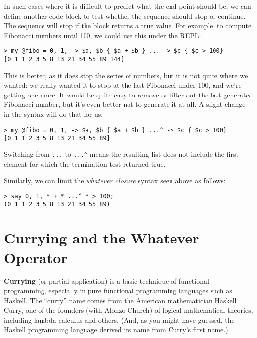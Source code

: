 In such cases where it is difficult to predict what the end 
point should be, we can define another code block to test 
whether the sequence should stop or continue. The sequence 
will stop if the block returns a true value. For example, 
to compute Fibonacci numbers until 100, we could use this 
under the REPL:

\begin{verbatim}
> my @fibo = 0, 1, -> $a, $b { $a + $b } ... -> $c { $c > 100}
[0 1 1 2 3 5 8 13 21 34 55 89 144]
\end{verbatim}

This is better, as it does stop the series of numbers, but it is 
not quite where we wanted: we really wanted it to stop at the last 
Fibonacci under 100, and we're getting one more. It would be 
quite easy to remove or filter out the last generated Fibonacci 
number, but it's even better not to generate it at all. A slight 
change in the syntax will do that for us:

\begin{verbatim}
> my @fibo = 0, 1, -> $a, $b { $a + $b } ...^ -> $c { $c > 100}
[0 1 1 2 3 5 8 13 21 34 55 89]
\end{verbatim}

Switching from \verb'...' to \verb'...^' means the 
resulting list does not include the first element 
for which the termination test returned true.

Similarly, we can limit the \emph{whatever closure} 
syntax seen above as follows:

\begin{verbatim}
> say 0, 1, * + * ...^ * > 100;
(0 1 1 2 3 5 8 13 21 34 55 89)
\end{verbatim}

\section{Currying and the Whatever Operator}

{\bf Currying} (or partial application) is a basic technique 
of functional programming, especially in pure functional 
programming languages such as Haskell. The ``curry'' name comes 
from the American mathematician Haskell Curry, one of the 
founders (with Alonzo Church) of logical mathematical 
theories, including lambda-calculus and others. (And, as 
you might have guessed, the Haskell programming language 
derived its name from Curry's first name.)

